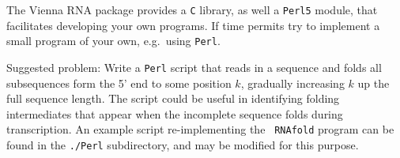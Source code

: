\documentclass{article}
\begin{document}
The Vienna RNA package provides a {\tt C} library, as well a {\tt Perl5}
module, that facilitates developing your own programs. If time permits
try to implement a small program of your own, e.g.\ using {\tt Perl}.

Suggested problem: Write a {\tt Perl} script that reads in a sequence and
folds all subsequences form the 5' end to some position $k$, gradually
increasing $k$ up the full sequence length. The script could be useful in
identifying folding intermediates that appear when the incomplete sequence
folds during transcription. An example script re-implementing the {\tt
RNAfold} program can be found in the {\tt ./Perl} subdirectory, and may be
modified for this purpose.
\end{document}
